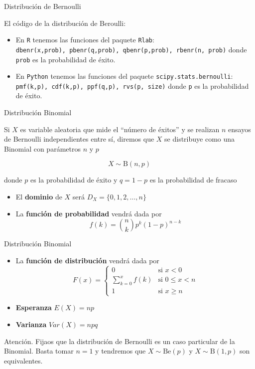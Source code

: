 \documentclass[
  ignorenonframetext,
]{beamer}
\providecommand{\tightlist}{%
  \setlength{\itemsep}{0pt}\setlength{\parskip}{0pt}}
\begin{document}
\begin{frame}[fragile]{Distribución de Bernoulli}
\protect\hypertarget{distribuciuxf3n-de-bernoulli-2}{}

El código de la distribución de Beroulli:

\begin{itemize}
\tightlist
\item
  En \texttt{R} tenemos las funciones del paquete \texttt{Rlab}:
  \texttt{dbenr(x,prob),\ pbenr(q,prob),\ qbenr(p,prob),\ rbenr(n,\ prob)}
  donde \texttt{prob} es la probabilidad de éxito.
\item
  En \texttt{Python} tenemos las funciones del paquete
  \texttt{scipy.stats.bernoulli}:
  \texttt{pmf(k,p),\ cdf(k,p),\ ppf(q,p),\ rvs(p,\ size)} donde
  \texttt{p} es la probabilidad de éxito.
\end{itemize}

\end{frame}

\begin{frame}{Distribución Binomial}
\protect\hypertarget{distribuciuxf3n-binomial}{}

Si \(X\) es variable aleatoria que mide el ``número de éxitos'' y se
realizan \(n\) ensayos de Bernoulli independientes entre sí, diremos que
\(X\) se distribuye como una Binomial con parámetros \(n\) y \(p\)

\[X\sim \text{B}(n,p)\]

donde \(p\) es la probabilidad de éxito y \(q = 1-p\) es la probabilidad
de fracaso

\begin{itemize}
\tightlist
\item
  El \textbf{dominio} de \(X\) será \(D_X = \{0,1,2,\dots,n\}\)
\item
  La \textbf{función de probabilidad} vendrá dada por
  \[f(k) = {n\choose k}p^k(1-p)^{n-k} \]
\end{itemize}

\end{frame}

\begin{frame}{Distribución Binomial}
\protect\hypertarget{distribuciuxf3n-binomial-1}{}

\begin{itemize}
\tightlist
\item
  La \textbf{función de distribución} vendrá dada por \[F(x) = \left\{
  \begin{array}{cl}
     0 & \text{si } x<0 
  \\ \sum_{k=0}^xf(k) & \text{si } 0\le x<n
  \\ 1 & \text{si } x\ge n
  \end{array}
  \right.\]
\item
  \textbf{Esperanza} \(E(X) = np\)
\item
  \textbf{Varianza} \(Var(X) = npq\)
\end{itemize}

Atención. Fijaos que la distribución de Bernoulli es un caso particular
de la Binomial. Basta tomar \(n=1\) y tendremos que
\(X\sim \text{Be}(p)\) y \(X\sim\text{B}(1,p)\) son equivalentes.

\end{frame}
\end{document}
